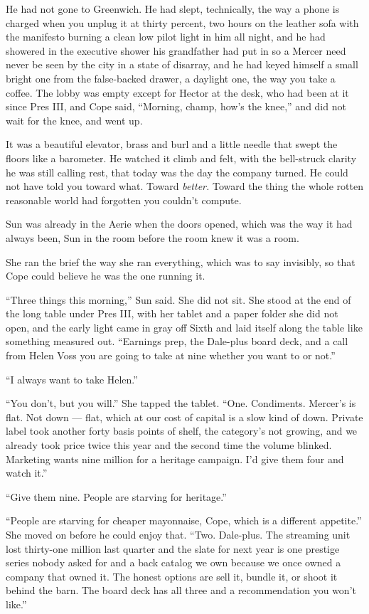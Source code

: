 \documentclass[11pt,openany]{book}
\newcommand{\scenebreak}{\par\vspace{0.5\baselineskip}\begin{center}\textasteriskcentered\quad\textasteriskcentered\quad\textasteriskcentered\end{center}\vspace{0.5\baselineskip}\par}
\begin{document}
He had not gone to Greenwich. He had slept, technically, the way a phone is charged when you unplug it at thirty percent, two hours on the leather sofa with the manifesto burning a clean low pilot light in him all night, and he had showered in the executive shower his grandfather had put in so a Mercer need never be seen by the city in a state of disarray, and he had keyed himself a small bright one from the false-backed drawer, a daylight one, the way you take a coffee. The lobby was empty except for Hector at the desk, who had been at it since Pres III, and Cope said, ``Morning, champ, how's the knee,'' and did not wait for the knee, and went up.

It was a beautiful elevator, brass and burl and a little needle that swept the floors like a barometer. He watched it climb and felt, with the bell-struck clarity he was still calling rest, that today was the day the company turned. He could not have told you toward what. Toward \textit{better.} Toward the thing the whole rotten reasonable world had forgotten you couldn't compute.

Sun was already in the Aerie when the doors opened, which was the way it had always been, Sun in the room before the room knew it was a room.


\scenebreak


She ran the brief the way she ran everything, which was to say invisibly, so that Cope could believe he was the one running it.

``Three things this morning,'' Sun said. She did not sit. She stood at the end of the long table under Pres III, with her tablet and a paper folder she did not open, and the early light came in gray off Sixth and laid itself along the table like something measured out. ``Earnings prep, the Dale-plus board deck, and a call from Helen Voss you are going to take at nine whether you want to or not.''

``I always want to take Helen.''

``You don't, but you will.'' She tapped the tablet. ``One. Condiments. Mercer's is flat. Not down --- flat, which at our cost of capital is a slow kind of down. Private label took another forty basis points of shelf, the category's not growing, and we already took price twice this year and the second time the volume blinked. Marketing wants nine million for a heritage campaign. I'd give them four and watch it.''

``Give them nine. People are starving for heritage.''

``People are starving for cheaper mayonnaise, Cope, which is a different appetite.'' She moved on before he could enjoy that. ``Two. Dale-plus. The streaming unit lost thirty-one million last quarter and the slate for next year is one prestige series nobody asked for and a back catalog we own because we once owned a company that owned it. The honest options are sell it, bundle it, or shoot it behind the barn. The board deck has all three and a recommendation you won't like.''
\end{document}
